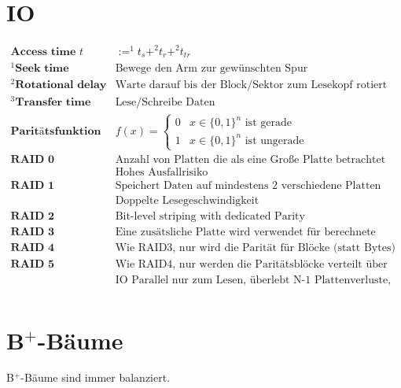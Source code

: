 \documentclass{article}
\begin{document}
	\section*{IO}
		\begin{align*}
			\textbf{Access time $t$} & := ^1t_s + ^2t_r + ^2t_{tr}\\
			^1\textbf{Seek time } & \text{Bewege den Arm zur gew\"unschten Spur}\\
			^2\textbf{Rotational delay } & \text{Warte darauf bis der Block/Sektor zum Lesekopf rotiert ist}\\
			^3\textbf{Transfer time } & \text{Lese/Schreibe Daten}\\
			\textbf{Parit\"atsfunktion } & f(x) = \begin{cases}0 & x \in \{0,1\}^n \text{ ist gerade}\\1 & x \in \{0,1\}^n \text{ ist ungerade}\end{cases}\\
			\textbf{RAID 0 } & \text{Anzahl von Platten die als eine Gro\ss e Platte betrachtet wird}\\
			& \text{Hohes Ausfallrisiko}\\
			\textbf{RAID 1 } & \text{Speichert Daten auf mindestens 2 verschiedene Platten}\\
			& \text{Doppelte Lesegeschwindigkeit}\\
			\textbf{RAID 2 } & \text{Bit-level striping with dedicated Parity}\\
			\textbf{RAID 3 } & \text{Eine zus\"atsliche Platte wird verwendet f\"ur berechnete Parit\"at f\"ur der Hamming Error Correct Code}\\
			\textbf{RAID 4 } & \text{Wie RAID3, nur wird die Parit\"at f\"ur Bl\"ocke (statt Bytes) berechnet}\\
			\textbf{RAID 5 } & \text{Wie RAID4, nur werden die Parit\"atsbl\"ocke verteilt \"uber mehrere Platten}\\
			& \text{IO Parallel nur zum Lesen, \"uberlebt N-1 Plattenverluste, Spiegelung/Replikation}\\
		\end{align*}
	\section*{B$^+$-B\"aume}
		B$^+$-B\"aume sind immer balanziert.
		\begin{align*}
			\textbf{} & \\
		\end{align*}
\end{document}
